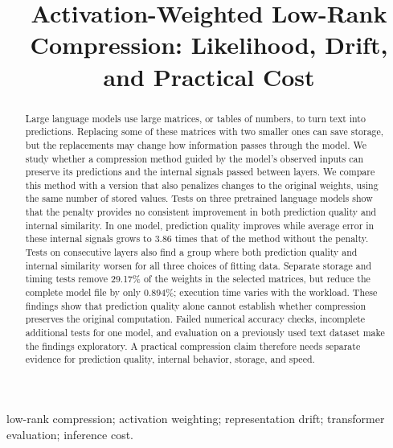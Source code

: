 \documentclass[conference]{IEEEtran}
\begin{document}
\title{Activation-Weighted Low-Rank Compression: Likelihood, Drift, and Practical Cost}
\author{}
\maketitle
\begin{abstract}Large language models use large matrices, or tables of numbers, to turn text into predictions. Replacing some of these matrices with two smaller ones can save storage, but the replacements may change how information passes through the model. We study whether a compression method guided by the model's observed inputs can preserve its predictions and the internal signals passed between layers. We compare this method with a version that also penalizes changes to the original weights, using the same number of stored values. Tests on three pretrained language models show that the penalty provides no consistent improvement in both prediction quality and internal similarity. In one model, prediction quality improves while average error in these internal signals grows to 3.86 times that of the method without the penalty. Tests on consecutive layers also find a group where both prediction quality and internal similarity worsen for all three choices of fitting data. Separate storage and timing tests remove 29.17\% of the weights in the selected matrices, but reduce the complete model file by only 0.894\%; execution time varies with the workload. These findings show that prediction quality alone cannot establish whether compression preserves the original computation. Failed numerical accuracy checks, incomplete additional tests for one model, and evaluation on a previously used text dataset make the findings exploratory. A practical compression claim therefore needs separate evidence for prediction quality, internal behavior, storage, and speed.\end{abstract}
\begin{IEEEkeywords}low-rank compression; activation weighting; representation drift; transformer evaluation; inference cost.\end{IEEEkeywords}
\end{document}
